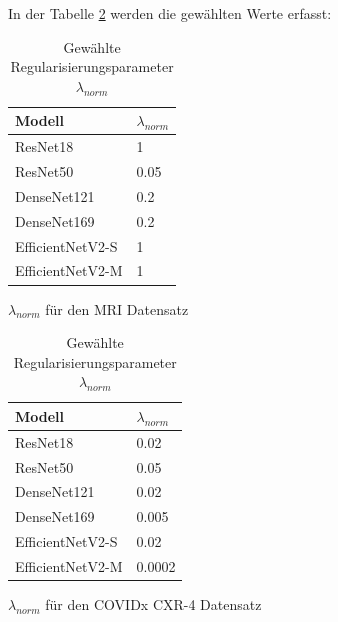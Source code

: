 In der Tabelle \ref{tab:Regularisierungsparameter} werden die gewählten Werte erfasst:

\begin{table}[H]
    \centering
    \begin{subtable}{0.45\linewidth}
        \centering
        \begin{tabular}{l|l}
            \hline
            \textbf{Modell} & \textbf{$\lambda_{norm}$} \\ 
            \hline
            ResNet18 & 1 \\
            \hline
            ResNet50 & 0.05 \\
            \hline
            DenseNet121 & 0.2\\
            \hline
            DenseNet169 & 0.2 \\
            \hline
            EfficientNetV2-S & 1\\
            \hline
            EfficientNetV2-M & 1\\
        \end{tabular}
        \caption{$\lambda_{norm}$ für den MRI Datensatz}
        \label{tab:BrainTumor}
    \end{subtable}%
    \hspace{0.05\linewidth} %
    \begin{subtable}{0.45\linewidth}
        \centering
        \begin{tabular}{l|l}
            \hline
            \textbf{Modell} & \textbf{$\lambda_{norm}$} \\ 
            \hline
            ResNet18 & 0.02 \\
            \hline
            ResNet50 & 0.05 \\
            \hline
            DenseNet121 & 0.02\\
            \hline
            DenseNet169 & 0.005 \\
            \hline
            EfficientNetV2-S & 0.02\\
            \hline
            EfficientNetV2-M & 0.0002\\
        \end{tabular}
        \caption{$\lambda_{norm}$ für den COVIDx CXR-4 Datensatz}
        \label{tab:COVIDxCXR4}
    \end{subtable}
    \caption{Gewählte  Regularisierungsparameter $\lambda_{norm}$}
    \label{tab:Regularisierungsparameter}
\end{table}

